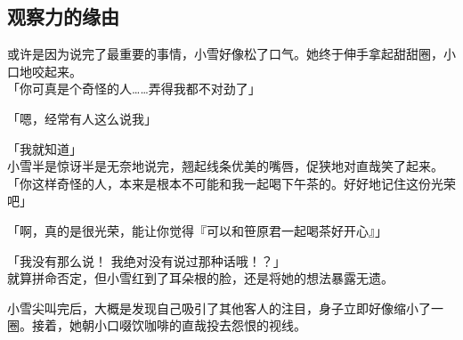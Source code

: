 \subsection{观察力的缘由}

或许是因为说完了最重要的事情，小雪好像松了口气。她终于伸手拿起甜甜圈，小口地咬起来。\\

「你可真是个奇怪的人……弄得我都不对劲了」

「嗯，经常有人这么说我」

「我就知道」\\

小雪半是惊讶半是无奈地说完，翘起线条优美的嘴唇，促狭地对直哉笑了起来。\\

「你这样奇怪的人，本来是根本不可能和我一起喝下午茶的。好好地记住这份光荣吧」

「啊，真的是很光荣，能让你觉得『可以和笹原君一起喝茶好开心』」

「我没有那么说！ 我绝对没有说过那种话哦！？」\\

就算拼命否定，但小雪红到了耳朵根的脸，还是将她的想法暴露无遗。

小雪尖叫完后，大概是发现自己吸引了其他客人的注目，身子立即好像缩小了一圈。接着，她朝小口啜饮咖啡的直哉投去怨恨的视线。\\

